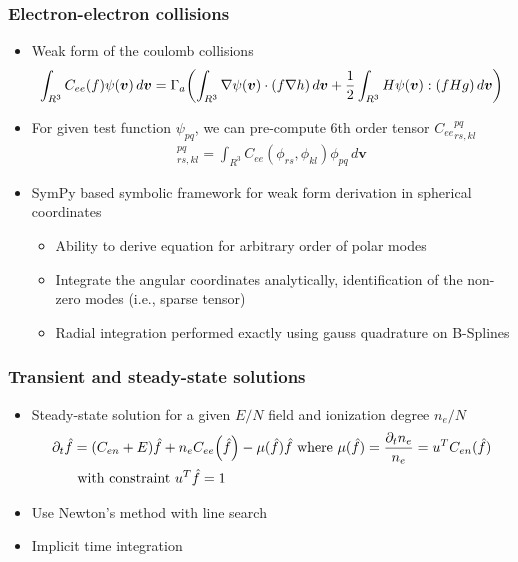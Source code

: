 \documentclass[mathserif, aspectratio=169]{beamer}
\newcommand{\vect}[1]{\boldsymbol{#1}}
\newcommand{\of}[1]{\mleft( #1 \mright)}
\newcommand{\diff}[1]{\, d#1}
\begin{document}
\begin{frame}
	\frametitle{Electron-electron collisions}
	\begin{itemize}
		\item Weak form of the coulomb collisions
		\begin{align}
			\int_{R^3} C_{ee}(f) \psi(\vect{v})\diff{\vect{v}} = \Gamma_a \of{\int_{R^3} \nabla \psi\of{\vect{v}} \cdot (f \nabla h ) \diff{\vect{v}}  + \frac{1}{2} \int_{R^3} H\psi\of{\vect{v}} : \of{f H g} \diff{\vect{v}}} 
		\end{align}
		\item For given test function $\psi_{pq}$, we can pre-compute 6th order tensor ${C_{ee}}_{rs,kl}^{pq}$
		\begin{align}
			[C_{ee}]_{rs,kl}^{pq} = \int_{R^3} C_{ee}(\phi_{rs}, \phi_{kl}) \phi_{pq} \diff{\vect{v}} 
		\end{align}
		\item SymPy based symbolic framework for weak form derivation in spherical coordinates
		\begin{itemize}
			\item Ability to derive equation for arbitrary order of polar modes
			\item Integrate the angular coordinates analytically, identification of the non-zero modes (i.e., sparse tensor) 
			\item Radial integration performed exactly using gauss quadrature on B-Splines
		\end{itemize}
	\end{itemize}
\end{frame}

\begin{frame}
	\frametitle{Transient and steady-state solutions}
	\begin{itemize}
		\item Steady-state solution for a given $E/N$ field and ionization degree $n_e/N$ 
		\begin{align}
			\partial_t {\hat{f}} &=(C_{en}+E)\hat{f} + n_e C_{ee}\of{\hat{f}} - \mu(\hat{f}) \hat{f} \text{ where } \mu(\hat{f}) = \frac{\partial_t n_e}{n_e} = u^T C_{en}(\hat{f})\\
			&\text{ with constraint } u^T \hat{f} = 1 \nonumber 
		\end{align}
		\item Use Newton's method with line search
		\item Implicit time integration
	\end{itemize}
\end{frame}
\end{document}
